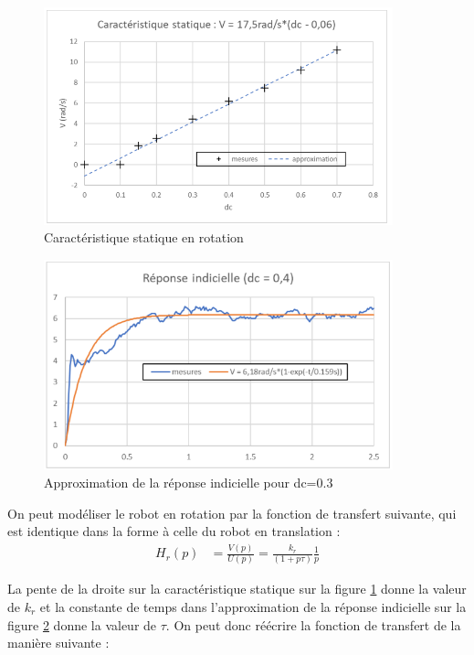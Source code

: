 \begin{figure}[H]
    \centering
    \includegraphics[width=0.9\textwidth]{Pictures/caracstatrot.png}
    \caption{Caractéristique statique en rotation}
    \label{fig:statrot}
\end{figure}

\begin{figure}[H]
    \centering
    \includegraphics[width=0.9\textwidth]{Pictures/approxreponstati.png}
    \caption{Approximation de la réponse indicielle pour dc=0.3}
    \label{fig:approxrot}
\end{figure}

On peut modéliser le robot en rotation par la fonction de transfert suivante, qui est identique dans la forme à celle du robot en translation : 
\begin{align*}
H_r(p)&=\frac{V(p)}{U(p)}=\frac{k_r}{(1+p \tau)} \frac{1}{p}
\end{align*}

La pente de la droite sur la caractéristique statique sur la figure \ref{fig:statrot} donne la valeur de $k_r$ et la constante de temps dans l'approximation de la réponse indicielle sur la figure \ref{fig:approxrot} donne la valeur de $\tau$. On peut donc réécrire la fonction de transfert de la manière suivante :

